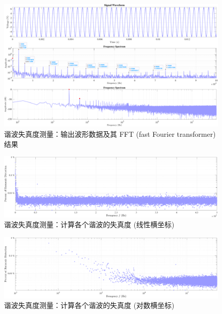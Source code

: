 \documentclass[UTF8]{article}
\begin{document}
\begin{figure}[H]\centering
    \includegraphics[width=\columnwidth]{LCE-03-功率放大器/assets/输出波形及其 FT 结果.pdf}
    \caption{谐波失真度测量：输出波形数据及其 FFT (fast Fourier transformer) 结果}
\end{figure}
\begin{figure}[H]\centering
    \includegraphics[width=\columnwidth]{LCE-03-功率放大器/assets/谐波失真图 (线性横坐标).pdf}
    \caption{谐波失真度测量：计算各个谐波的失真度 (线性横坐标)}
\end{figure}
\begin{figure}[H]\centering
    \includegraphics[width=\columnwidth]{LCE-03-功率放大器/assets/谐波失真图 (对数横坐标).pdf}
    \caption{谐波失真度测量：计算各个谐波的失真度 (对数横坐标)}
\end{figure}
\end{document}
